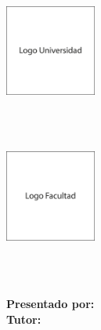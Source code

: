 \begin{titlepage}
    \begin{minipage}{2.7cm}
        \begin{center}
            \includegraphics[width=3cm,height=3cm]{img/logo_universidad.png}
        \end{center}
    \end{minipage}
    \hfill
    \begin{minipage}{11cm}
        \begin{center}
            \large{ \textbf{\MakeUppercase{\nombreUniversidad}} }\\
            \normalsize{ \textbf{\MakeUppercase{\nombreFacultad}} }\\
            \small{ \textbf{\MakeUppercase{\nombreCarrera}} }
        \end{center}
    \end{minipage}
    \hfill
    \begin{minipage}{3.0cm}
        \begin{center}
            \includegraphics[width=3.0cm,height=3.0cm]{img/logo_facultad.png}
        \end{center}
    \end{minipage}
    \vspace{5cm}\\
    \begin{center}
        \textbf{\MakeUppercase{\nombreProyecto}}
    \end{center}
    \vspace{4cm}
    \descripcion\\

    \vspace{2cm}
    \textnormal{\textbf{Presentado por:} \nombreAutor}\\

    \textnormal{\textbf{Tutor:} \nombreTutor}\\

    \vspace{2.5cm}
    \begin{center}
        \textbf{\MakeUppercase{\nombreCiudadPais}}\\
        \fecha
    \end{center}
\end{titlepage}
\restoregeometry